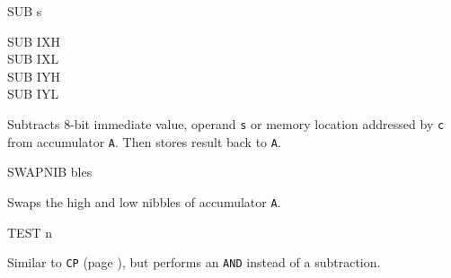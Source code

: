 \begin{basedescript}{
    \desclabelstyle{\multilinelabel}
    \desclabelwidth{3cm}}
\begin{DetailItem}{SUB s}
\begin{DetailVariants}
            \columnbreak
            SUB IXH\UNDOC\\
            SUB IXL\UNDOC\\
            SUB IYH\UNDOC\\
            SUB IYL\UNDOC
        \end{DetailVariants}

        Subtracts 8-bit immediate value, operand {\tt s} or memory location addressed by {\tt c} from accumulator {\tt A}. Then stores result back to {\tt A}.

        \begin{DetailEffects}[v]
            \FlagsSUBr
        \end{DetailEffects}
						
        \begin{DetailTiming}
        \end{DetailTiming}

    \end{DetailItem}

    \begin{DetailItem}{SWAPNIB\ZXN}
        { bles}
        {\SymSWAPNIB}

        Swaps the high and low nibbles of accumulator {\tt A}.

        \begin{DetailEffects}
            \FlagsSWAPNIB
        \end{DetailEffects}
						
        \begin{DetailTiming}
        \end{DetailTiming}

    \end{DetailItem}

    \begin{DetailItem}{TEST n\ZXN}
        {}
        {\SymTEST}

        Similar to {\tt CP} (page \pageref{DetailRefCP}), but performs an {\tt AND} instead of a subtraction.

        \begin{DetailEffects}[v]
            \FlagsTESTn
        \end{DetailEffects}
						
        \begin{DetailTiming}
        \end{DetailTiming}


\end{DetailItem}
\end{basedescript}
